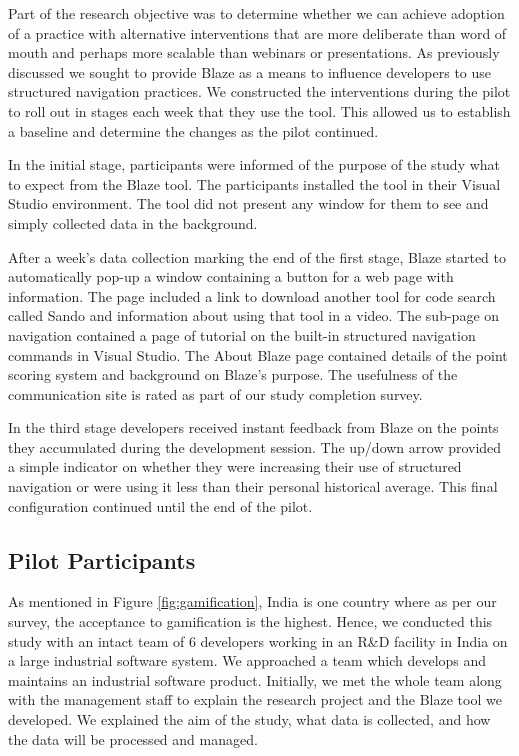 \documentclass{sig-alternate}
\begin{document}
Part of the research objective was to determine whether we can achieve adoption of a practice with alternative interventions that are more deliberate than word of mouth and perhaps more scalable than webinars or presentations.  As previously discussed we sought to provide Blaze as a means to influence developers to use structured navigation practices.  We constructed the interventions during the pilot to roll out in stages each week that they use the tool.  This allowed us to establish a baseline and determine the changes as the pilot continued.

In the initial stage, participants were informed of the purpose of the study what to expect from the Blaze tool.  The participants installed the tool in their Visual Studio environment.  The tool did not present any window for them to see and simply collected data in the background.   

After a week's data collection marking the end of the first stage, Blaze started to automatically pop-up a window containing a button for a web page with information.  The page included a link to download another tool for code search called Sando \cite{Shepherd2012Sando} and information about using that tool in a video.  The sub-page on navigation contained a page of tutorial on the built-in structured navigation commands in Visual Studio.  The About Blaze page contained details of the point scoring system and background on Blaze's purpose.  The usefulness of the communication site is rated as part of our study completion survey.

In the third stage developers received instant feedback from Blaze on the points they accumulated during the development session.  The up/down arrow provided a simple indicator on whether they were increasing their use of structured navigation or were using it less than their personal historical average.  This final configuration continued until the end of the pilot.  

\subsection{Pilot Participants}

As mentioned in Figure \ref{fig:gamification}, India is one country where as per our survey, the acceptance to gamification is the highest. Hence, we conducted this study with an intact team of 6 developers working in an R\&D facility in India on a large industrial software system. We approached a team which develops and maintains an industrial software product. Initially, we met the whole team along with the management staff to explain the research project and the Blaze tool we developed. We  explained the aim of the study, what data is collected, and how the data will be processed and managed. 
\end{document}
